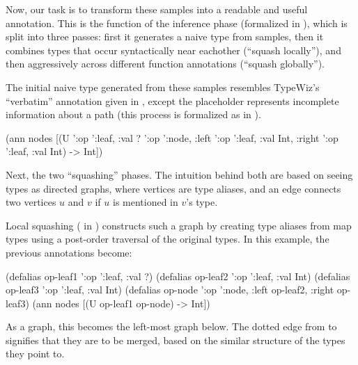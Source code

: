 Now, our task is to transform these samples into a readable and useful annotation.
This is the function of the inference phase (formalized in ),
which is split into three passes: first it generates a naive type from samples, then it
combines types that occur syntactically near eachother (``squash locally''),
and then aggressively across different function annotations (``squash globally'').

The initial naive type generated from these samples resembles TypeWiz's
``verbatim'' annotation given in , except
the  placeholder represents incomplete information about a path
(this process is formalized as \generatetenv{} in ).

\begin{cljlisting}
(ann nodes [(U '{:op ':leaf, :val ?} '{:op ':node,
                                       :left '{:op ':leaf, :val Int},
                                       :right '{:op ':leaf, :val Int}}) -> Int])
\end{cljlisting}

Next, the two ``squashing'' phases.
The intuition behind both are based on seeing types as directed graphs,
where vertices are type aliases, and an edge connects
two vertices $u$ and $v$ if $u$ is mentioned in $v$'s type.

Local squashing (\squashlocal{} in )
constructs such a graph by creating type aliases from map types
using a post-order traversal of the original types.
In this example, the previous annotations become:

\begin{cljlisting}
(defalias op-leaf1 '{:op ':leaf, :val ?})
(defalias op-leaf2 '{:op ':leaf, :val Int})
(defalias op-leaf3 '{:op ':leaf, :val Int})
(defalias op-node '{:op ':node, :left op-leaf2, :right op-leaf3})
(ann nodes [(U op-leaf1 op-node) -> Int])
\end{cljlisting}

As a graph, this becomes the left-most graph below. The dotted edge
from  to  signifies that they are to be merged,
based on the similar structure of the types they point to.

